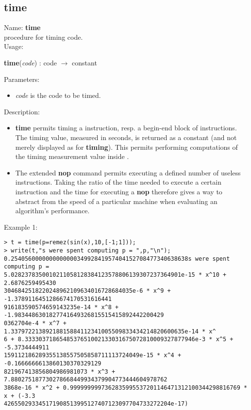 \subsection{time}
\label{labtime}
\noindent Name: \textbf{time}\\
\phantom{aaa}procedure for timing \sollya code.\\[0.2cm]
\noindent Usage: 
\begin{center}
\textbf{time}(\emph{code}) : \textsf{code} $\rightarrow$ \textsf{constant}\\
\end{center}
Parameters: 
\begin{itemize}
\item \emph{code} is the code to be timed.
\end{itemize}
\noindent Description: \begin{itemize}

\item \textbf{time} permits timing a \sollya instruction, resp. a begin-end block
   of \sollya instructions. The timing value, measured in seconds, is returned
   as a \sollya constant (and not merely displayed as for \textbf{timing}). This 
   permits performing computations of the timing measurement value inside \sollya.

\item The extended \textbf{nop} command permits executing a defined number of
   useless instructions. Taking the ratio of the time needed to execute a
   certain \sollya instruction and the time for executing a \textbf{nop}
   therefore gives a way to abstract from the speed of a particular 
   machine when evaluating an algorithm's performance.
\end{itemize}
\noindent Example 1: 
\begin{center}\begin{minipage}{15cm}\begin{Verbatim}[frame=single]
> t = time(p=remez(sin(x),10,[-1;1]));
> write(t,"s were spent computing p = ",p,"\n");
0.254056000000000000034992841957404152708477340638638s were spent computing p = 
5.0282378350010211058128384123578806139307237364901e-15 * x^10 + 2.6876259495430
3046842518220248962109634016728684035e-6 * x^9 + -1.3789116451286674170531616441
916183590574659143235e-14 * x^8 + -1.9834486301827741649326815515415892442200429
0362704e-4 * x^7 + 1.33797221389218815884112341005509833434214820600635e-14 * x^
6 + 8.3333037186548537651002133031675072810009327877946e-3 * x^5 + -5.3734444911
159112186289355138557505858711113724049e-15 * x^4 + -0.1666666613860130370329129
821967413856804986981073 * x^3 + 7.880275187730278668449934379904773444604978762
3868e-16 * x^2 + 0.9999999997362835995537201146471312100344298816769 * x + (-3.3
426550293345171908513995127407123097704733272204e-17)
\end{Verbatim}
\end{minipage}\end{center}
